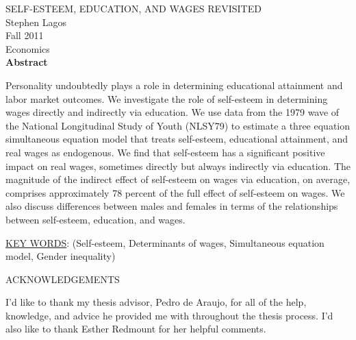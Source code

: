 \documentclass[12pt]{report}
\newcommand{\prbf}[1]{\textbf{#1}}
\begin{document}
\newpage
\vspace*{1cm}
\begin{center}
SELF-ESTEEM, EDUCATION, AND WAGES REVISITED\\
\vspace{0.5cm}
Stephen Lagos\\
\vspace{0.5cm}
Fall 2011\\
\vspace{0.5cm}
Economics\\
\vspace{0.5cm}
\prbf{Abstract}
\end{center}
\vspace{0.55cm}
Personality undoubtedly plays a role in determining educational attainment and labor market outcomes. We investigate the role of self-esteem in determining wages directly and indirectly via education. We use data from the 1979 wave of the National Longitudinal Study of Youth (NLSY79) to estimate a three equation simultaneous equation model that treats self-esteem, educational attainment, and real wages as endogenous. We find that self-esteem has a significant positive impact on real wages, sometimes directly but always indirectly via education. The magnitude of the indirect effect of self-esteem on wages via education, on average, comprises approximately 78 percent of the full effect of self-esteem on wages. We also discuss differences between males and females in terms of the relationships between self-esteem, education, and wages.
\vspace{0.2cm}
\begin{singlespace}
\noindent \underline{KEY WORDS}: (Self-esteem, Determinants of wages, Simultaneous equation model, Gender inequality)\\
\end{singlespace}
\thispagestyle{empty}

\newpage
\thispagestyle{empty}
\mbox{}

\newpage
\renewcommand\thepage{}
\tableofcontents




\newpage

\listoftables
\thispagestyle{empty}
\renewcommand\thepage{\arabic{page}}

\newpage

\begin{center}ACKNOWLEDGEMENTS\end{center}
\thispagestyle{empty}

I'd like to thank my thesis advisor, Pedro de Araujo, for all of the help, knowledge, and advice he provided me with throughout the thesis process. I'd also like to thank Esther Redmount for her helpful comments.
\end{document}
